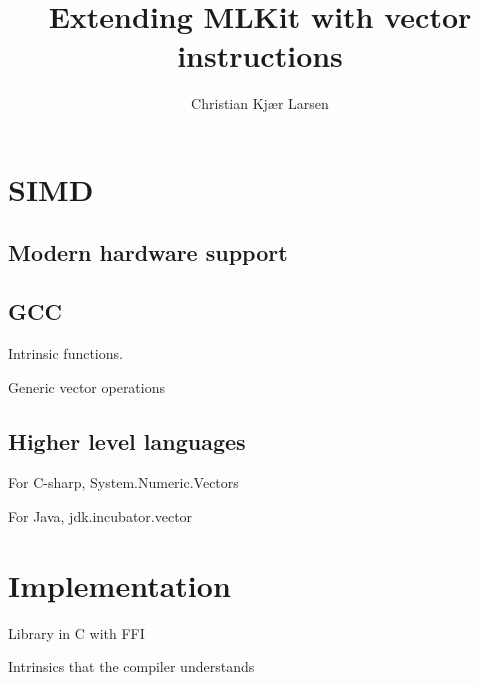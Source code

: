 \documentclass{article}
\title{Extending MLKit with vector instructions}
\author{Christian Kjær Larsen}
\begin{document}
\maketitle

\section{SIMD}

\subsection{Modern hardware support}

\subsection{GCC}

Intrinsic functions.

Generic vector operations

\subsection{Higher level languages}

For C-sharp, System.Numeric.Vectors

For Java, jdk.incubator.vector


\section{Implementation}

Library in C with FFI

Intrinsics that the compiler understands
\end{document}
